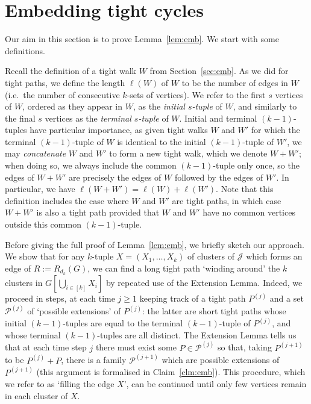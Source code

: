 \documentclass[12pt,a4paper]{amsart}
\newcommand{\cJ}{\mathcal{J}}
\newcommand{\paths}{\mathscr{P}}
\begin{document}
\section{Embedding tight cycles} \label{sec:embedding} 

Our aim in this section is to prove Lemma~\ref{lem:emb}. We start with some definitions.

Recall the definition of a tight walk $W$ from Section~\ref{sec:emb}. As we did for tight paths, we define the length $\ell(W)$ of $W$ to be the number of edges in $W$ (i.e.~the number of consecutive $k$-sets of vertices). We refer to the first $s$ vertices of $W$, ordered as they appear in $W$, as the \emph{initial $s$-tuple} of $W$, and similarly to the final $s$ vertices as the \emph{terminal $s$-tuple} of $W$. Initial and terminal $(k-1)$-tuples have particular importance, as given tight walks $W$ and $W'$ for which the terminal $(k-1)$-tuple of $W$ is identical to the initial $(k-1)$-tuple of $W'$, we may \emph{concatenate} $W$ and $W'$ to form a new tight walk, which we denote $W + W'$; when doing so, we always include the common $(k-1)$-tuple only once, so the edges of $W + W'$ are precisely the edges of $W$ followed by the edges of $W'$. In particular, we have $\ell(W + W') = \ell(W) + \ell(W')$. Note that this definition includes the case where $W$ and $W'$ are tight paths, in which case $W + W'$ is also a tight path provided that $W$ and $W'$ have no common vertices outside this common $(k-1)$-tuple.


Before giving the full proof of Lemma~\ref{lem:emb}, we briefly sketch our approach. We show that
for any $k$-tuple $X = (X_1, \dots, X_k)$ of clusters of $\cJ$ which forms an
edge of $R := R_{d_k}(G)$, we can find a long tight path `winding around' the $k$ clusters in $G[\bigcup_{i \in [k]}
X_i]$ by repeated use of the Extension Lemma. Indeed, we proceed in steps, at
each time $j \geq 1$ keeping track of a tight path $P^{(j)}$ and a set
$\paths^{(j)}$ of `possible extensions' of $P^{(j)}$: the latter are short tight
paths whose initial $(k-1)$-tuples are equal to the terminal $(k-1)$-tuple of
$P^{(j)}$, and whose terminal $(k-1)$-tuples are all distinct. The
Extension Lemma tells us that at each time step $j$ there must
exist some $P \in \paths^{(j)}$ so that, taking $P^{(j+1)}$ to be $P^{(j)} + P$, there
is a family $\paths^{(j+1)}$ which are possible extensions of $P^{(j+1)}$ (this
argument is formalised in Claim~\ref{clm:emb}). This procedure, which we refer to as `filling the edge $X$', can be continued until only few vertices remain in each cluster of $X$.
\end{document}
